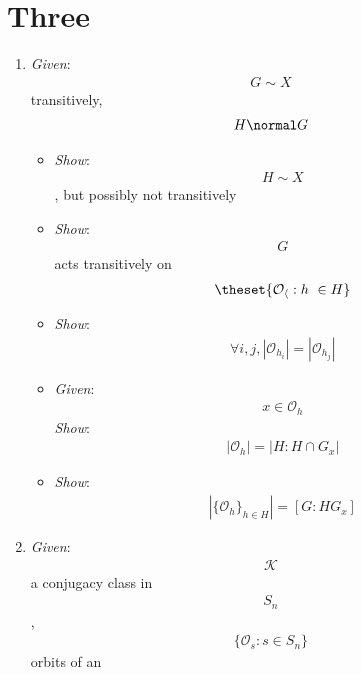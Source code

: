 \hypertarget{three}{%
\section{Three}\label{three}}

\begin{enumerate}
\def\labelenumi{\arabic{enumi}.}
\item
  \emph{Given}: \begin{align*}G \sim X\end{align*} transitively,
  \begin{align*}H \normal G\end{align*}

  \begin{itemize}
  \tightlist
  \item
    \emph{Show}: \begin{align*}H \sim X\end{align*}, but possibly not
    transitively
  \item
    \emph{Show}: \begin{align*}G\end{align*} acts transitively on
    \begin{align*}\theset{ \mathcal{O_h} : h\ \in H}\end{align*}
  \item
    \emph{Show}:
    \begin{align*}\forall i, j, |\mathcal{O}_{h_i}| = |\mathcal{O}_{h_j}|\end{align*}
  \item
    \emph{Given}: \begin{align*}x\in \mathcal{O}_h\end{align*}
    \emph{Show}:
    \begin{align*}|\mathcal{O}_h| = |H : H \cap G_x|\end{align*}
  \item
    \emph{Show}:
    \begin{align*}|\{\mathcal{O}_h\}_{h\in H}| = [G : HG_x]\end{align*}
  \end{itemize}
\item
  \emph{Given}: \begin{align*}\mathcal{K}\end{align*} a conjugacy class
  in \begin{align*}S_n\end{align*},
  \begin{align*}\{\mathcal{O}_{s}:s\in S_n\}\end{align*} orbits of an

\end{enumerate}
